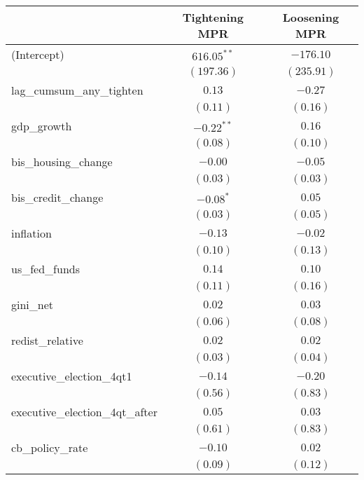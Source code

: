 
\begin{tabular}{l c c }
\hline
 & Tightening MPR & Loosening MPR \\
\hline
(Intercept)                     & $616.05^{**}$ & $-176.10$  \\
                                & $(197.36)$    & $(235.91)$ \\
lag\_cumsum\_any\_tighten       & $0.13$        & $-0.27$    \\
                                & $(0.11)$      & $(0.16)$   \\
gdp\_growth                     & $-0.22^{**}$  & $0.16$     \\
                                & $(0.08)$      & $(0.10)$   \\
bis\_housing\_change            & $-0.00$       & $-0.05$    \\
                                & $(0.03)$      & $(0.03)$   \\
bis\_credit\_change             & $-0.08^{*}$   & $0.05$     \\
                                & $(0.03)$      & $(0.05)$   \\
inflation                       & $-0.13$       & $-0.02$    \\
                                & $(0.10)$      & $(0.13)$   \\
us\_fed\_funds                  & $0.14$        & $0.10$     \\
                                & $(0.11)$      & $(0.16)$   \\
gini\_net                       & $0.02$        & $0.03$     \\
                                & $(0.06)$      & $(0.08)$   \\
redist\_relative                & $0.02$        & $0.02$     \\
                                & $(0.03)$      & $(0.04)$   \\
executive\_election\_4qt1       & $-0.14$       & $-0.20$    \\
                                & $(0.56)$      & $(0.83)$   \\
executive\_election\_4qt\_after & $0.05$        & $0.03$     \\
                                & $(0.61)$      & $(0.83)$   \\
cb\_policy\_rate                & $-0.10$       & $0.02$     \\
                                & $(0.09)$      & $(0.12)$   \\

\end{tabular}
